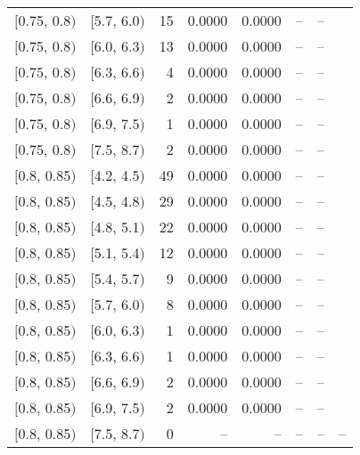 \begin{longtable}{| l | l | r | r | r | r | r | r |}
        $[$0.75, 0.8$)$ & $[$5.7, 6.0$)$ & 15  & 0.0000 & 0.0000 & -- & -- \\
        $[$0.75, 0.8$)$ & $[$6.0, 6.3$)$ & 13  & 0.0000 & 0.0000 & -- & -- \\
        $[$0.75, 0.8$)$ & $[$6.3, 6.6$)$ & 4   & 0.0000 & 0.0000 & -- & -- \\
        $[$0.75, 0.8$)$ & $[$6.6, 6.9$)$ & 2   & 0.0000 & 0.0000 & -- & -- \\
        $[$0.75, 0.8$)$ & $[$6.9, 7.5$)$ & 1   & 0.0000 & 0.0000 & -- & -- \\
        $[$0.75, 0.8$)$ & $[$7.5, 8.7$)$ & 2   & 0.0000 & 0.0000 & -- & -- \\
        $[$0.8, 0.85$)$ & $[$4.2, 4.5$)$ & 49  & 0.0000 & 0.0000 & -- & -- \\
        $[$0.8, 0.85$)$ & $[$4.5, 4.8$)$ & 29  & 0.0000 & 0.0000 & -- & -- \\
        $[$0.8, 0.85$)$ & $[$4.8, 5.1$)$ & 22  & 0.0000 & 0.0000 & -- & -- \\
        $[$0.8, 0.85$)$ & $[$5.1, 5.4$)$ & 12  & 0.0000 & 0.0000 & -- & -- \\
        $[$0.8, 0.85$)$ & $[$5.4, 5.7$)$ & 9   & 0.0000 & 0.0000 & -- & -- \\
        $[$0.8, 0.85$)$ & $[$5.7, 6.0$)$ & 8   & 0.0000 & 0.0000 & -- & -- \\
        $[$0.8, 0.85$)$ & $[$6.0, 6.3$)$ & 1   & 0.0000 & 0.0000 & -- & -- \\
        $[$0.8, 0.85$)$ & $[$6.3, 6.6$)$ & 1   & 0.0000 & 0.0000 & -- & -- \\
        $[$0.8, 0.85$)$ & $[$6.6, 6.9$)$ & 2   & 0.0000 & 0.0000 & -- & -- \\
        $[$0.8, 0.85$)$ & $[$6.9, 7.5$)$ & 2   & 0.0000 & 0.0000 & -- & -- \\
        $[$0.8, 0.85$)$ & $[$7.5, 8.7$)$ & 0   & -- & -- & -- & -- & -- \\
\end{longtable}
